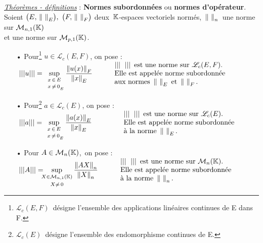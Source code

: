 \underline{\emph{Théorèmes - définitions}} : \textbf{Normes subordonnées} ou \textbf{normes d'opérateur}.\vspace{0.1cm}\\
Soient \(\bigl(E,\,\norm{\ }_E\bigr),\ \bigl(F,\,\norm{\ }_F\bigr)\) deux \(\,\mathbb{K}\)-espaces vectoriels normés, \(\displaystyle\,\left\lVert\ \right\rVert_n\,\) une norme sur \(\mathcal{M}_{n,1}(\mathbb{K})\)\vspace{0.1cm}\\
et \normtxt{\ } une norme sur \(\mathcal{M}_{p,1}(\mathbb{K})\).
\begin{itemize}[leftmargin=0cm]
    \item[•] Pour\footnote{\(\mathscr{L}_c(E,F)\,\) désigne l'ensemble des applications linéaires continues de E dans F.} \(u\in \mathscr{L}_c(E,F)\), on pose : \(\displaystyle \ \lvert\lvert\lvert u \rvert\rvert\rvert=\sup_{\substack{x\,\in\, E\vspace{0.1cm} \\ \ \, x\,\neq\, 0_{_E}}}\frac{\norm{u(x)}_F}{\norm{x}_E}\qquad \ \;
    \begin{array}{l}
        \lvert\lvert\lvert \ \; \rvert\rvert\rvert \, \text{ est une norme sur } \mathscr{L}_c(E,F). \\
        \text{Elle est appelée norme subordonnée} \\
        \text{aux normes } \norm{\ }_E\text{ et }\norm{\ }_F.
    \end{array}\)
    
    \item[•] Pour\footnote{\(\mathscr{L}_c(E)\,\) désigne l'ensemble des endomorphisme continues de E.} \(a\in \mathscr{L}_c(E)\), on pose : \(\displaystyle \ \lvert\lvert\lvert a \rvert\rvert\rvert=\sup_{\substack{x\,\in\, E\vspace{0.1cm} \\ \ \,x\,\neq\, 0_{_E}}}\frac{\norm{a(x)}_E}{\norm{x}_E}\qquad\qquad
    \begin{array}{l}
        \lvert\lvert\lvert \ \; \rvert\rvert\rvert \, \text{ est une norme sur } \mathscr{L}_c(E). \\
        \text{Elle est appelée norme subordonnée} \\
        \text{à la norme } \norm{\ }_E.
    \end{array}\)
    
    \item[•] Pour \(A\in \mathcal{M}_n(\mathbb{K})\),\, on pose : \(\ \displaystyle \left\lvert\left\lvert\left\lvert A \right\rvert\right\rvert\right\rvert =\hspace{-0.2cm} \sup_{\substack{X\in \mathcal{M}_{n,1}(\KK)\vspace{0.1cm} \\ X\neq\, 0}} \frac{\norm{AX}_n}{\norm{X}_n}\qquad \ \
    \begin{array}{l}
        \lvert\lvert\lvert \ \; \rvert\rvert\rvert \, \text{ est une norme sur } \mathcal{M}_n(\KK). \\
        \text{Elle est appelée norme subordonnée} \\
        \text{à la norme } \norm{\ }_n.
    \end{array}\)
    

\end{itemize}
